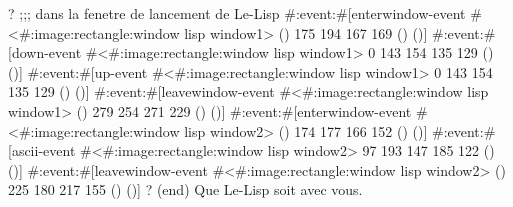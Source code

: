 ? ;;; dans la fenetre de lancement de Le-Lisp
#:event:#[enterwindow-event #<#:image:rectangle:window lisp window1> () 175 
194 167 169 () ()]
#:event:#[down-event #<#:image:rectangle:window lisp window1> 0 143 154 135 
129 () ()]
#:event:#[up-event #<#:image:rectangle:window lisp window1> 0 143 154 135 129 
() ()]
#:event:#[leavewindow-event #<#:image:rectangle:window lisp window1> () 279 
254 271 229 () ()]
#:event:#[enterwindow-event #<#:image:rectangle:window lisp window2> () 174 
177 166 152 () ()]
#:event:#[ascii-event #<#:image:rectangle:window lisp window2> 97 193 147 185 
122 () ()]
#:event:#[leavewindow-event #<#:image:rectangle:window lisp window2> () 225 
180 217 155 () ()]
? (end)
Que Le-Lisp soit avec vous.
\EndLL

\newpage
\bigskip

\tableofcontents
\listoftables

\End
